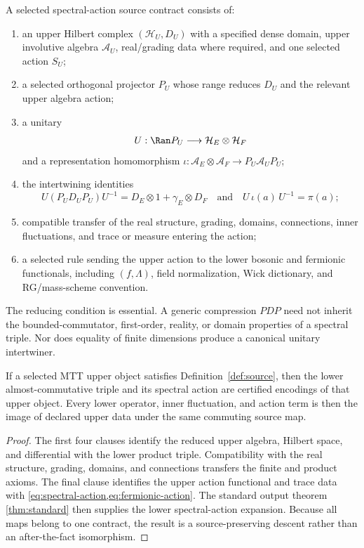 \documentclass[11pt]{article}
\newcommand{\AF}{\mathcal{A}_F}
\newcommand{\HF}{\mathcal{H}_F}
\newcommand{\DF}{D_F}
\newcommand{\AlgE}{\mathcal{A}_E}
\newcommand{\HilbE}{\mathcal{H}_E}
\newcommand{\DirE}{D_E}
\newcommand{\AU}{\mathcal{A}_U}
\newcommand{\HU}{\mathcal{H}_U}
\newcommand{\DU}{D_U}
\newcommand{\PU}{P_U}
\begin{document}
\begin{definition}\label{def:source}
A selected spectral-action source contract consists of:
\begin{enumerate}
\item an upper Hilbert complex $(\HU,\DU)$ with a specified dense domain,
upper involutive algebra $\AU$, real/grading data where required, and one
selected action $S_U$;
\item a selected orthogonal projector $\PU$ whose range reduces $\DU$ and the
relevant upper algebra action;
\item a unitary
\[
 U:\Ran\PU\longrightarrow \HilbE\otimes\HF
\]
and a representation homomorphism
$\iota:\AlgE\otimes\AF\to\PU\AU\PU$;
\item the intertwining identities
\[
 U(\PU\DU\PU)U^{-1}
 =\DirE\otimes1+\gamma_E\otimes\DF
 \quad\text{and}\quad
 U\,\iota(a)\,U^{-1}=\pi(a);
\]
\item compatible transfer of the real structure, grading, domains,
connections, inner fluctuations, and trace or measure entering the action;
\item a selected rule sending the upper action to the lower bosonic and
fermionic functionals, including $(f,\Lambda)$, field normalization, Wick
dictionary, and RG/mass-scheme convention.
\end{enumerate}
\end{definition}

The reducing condition is essential.  A generic compression $PDP$ need not
inherit the bounded-commutator, first-order, reality, or domain properties of a
spectral triple.  Nor does equality of finite dimensions produce a canonical
unitary intertwiner.

\begin{theorem}\label{thm:descent}
If a selected MTT upper object satisfies
Definition~\ref{def:source}, then the lower almost-commutative triple and its spectral
action are certified encodings of that upper object.  Every lower operator,
inner fluctuation, and action term is then the image of declared upper data
under the same commuting source map.
\end{theorem}

\begin{proof}
The first four clauses identify the reduced upper algebra, Hilbert space, and
differential with the lower product triple.  Compatibility with the real
structure, grading, domains, and connections transfers the finite and product
axioms.  The final clause identifies the upper action functional and trace data
with \cref{eq:spectral-action,eq:fermionic-action}.  The standard output theorem
\ref{thm:standard} then supplies the lower spectral-action expansion.  Because
all maps belong to one contract, the result is a source-preserving descent
rather than an after-the-fact isomorphism.
\end{proof}
\end{document}
